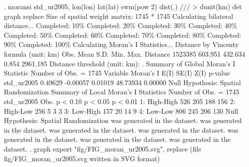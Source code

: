 . moransi std_ur2005, lon(lon) lat(lat) swm(pow 2) dist(.) ///
>         dunit(km) det graph replace
{\smallskip}
Size of spatial weight matrix: 1745 * 1745
Calculating bilateral distance...
{\TOPT}
{\VBAR}Completed:  10\%{\VBAR}
{\VBAR}Completed:  20\%{\VBAR}
{\VBAR}Completed:  30\%{\VBAR}
{\VBAR}Completed:  40\%{\VBAR}
{\VBAR}Completed:  50\%{\VBAR}
{\VBAR}Completed:  60\%{\VBAR}
{\VBAR}Completed:  70\%{\VBAR}
{\VBAR}Completed:  80\%{\VBAR}
{\VBAR}Completed:  90\%{\VBAR}
{\VBAR}Completed: 100\%{\VBAR}
{\BOTT}
Calculating Moran's I Statistics...
{\smallskip}
Distance by Vincenty formula (unit: km)
                     {\VBAR}        Obs.        Mean         S.D.         Min.         Max.
            Distance {\VBAR}     1523385     603.951      432.634        0.854     2961.185
Distance threshold (unit: km):     .
{\smallskip}
{\smallskip}
Summary of Global Moran's I Statistic                      Number of Obs. =      1745
            Variable {\VBAR}  Moran's I         E(I)        SE(I)         Z(I)      p-value
          std_ur2005 {\VBAR}    0.49629     -0.00057      0.01019     48.73934      0.00000
Null Hypothesis: Spatial Randomization
{\smallskip}
{\smallskip}
Summary of Local Moran's I Statistics                      Number of Obs. =      1745
          std_ur2005 {\VBAR}           Obs.        p < 0.10        p < 0.05        p < 0.01
        1: High-High {\VBAR}            526             205             188             156
        2: High-Low  {\VBAR}            256               5               3               3
        3: Low-High  {\VBAR}            157              20              14               9
        4: Low-Low   {\VBAR}            806             245             206             130
Null Hypothesis: Spatial Randomization
{\smallskip}
{} was generated in the dataset.
{} was generated in the dataset.
{} was generated in the dataset.
{} was generated in the dataset.
{} was generated in the dataset.
{} was generated in the dataset.
{} was generated in the dataset.
{\smallskip}
. graph export "fig/FIG_moran_ur2005.svg", replace
(file fig/FIG_moran_ur2005.svg written in SVG format)
